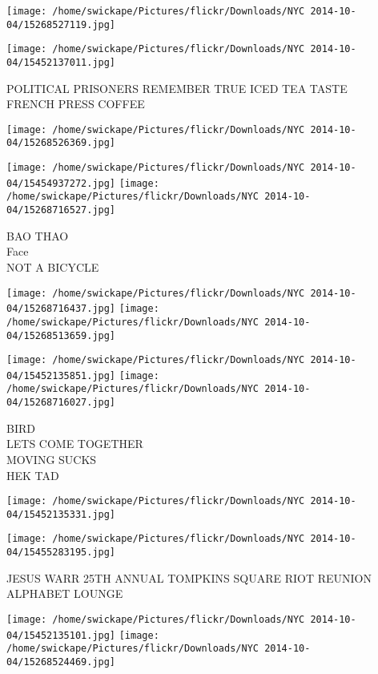 \documentclass[10pt,letterpaper]{article}
\begin{document}
\texttt{[image: /home/swickape/Pictures/flickr/Downloads/NYC 2014-10-04/15268527119.jpg]}

\vspace{0.25in}
\texttt{[image: /home/swickape/Pictures/flickr/Downloads/NYC 2014-10-04/15452137011.jpg]}

POLITICAL PRISONERS REMEMBER TRUE ICED TEA TASTE\\
FRENCH PRESS COFFEE\\
\pagebreak

\texttt{[image: /home/swickape/Pictures/flickr/Downloads/NYC 2014-10-04/15268526369.jpg]}

\vspace{0.25in}
\texttt{[image: /home/swickape/Pictures/flickr/Downloads/NYC 2014-10-04/15454937272.jpg]}
\texttt{[image: /home/swickape/Pictures/flickr/Downloads/NYC 2014-10-04/15268716527.jpg]}

BAO THAO\\
Face\\
NOT A BICYCLE\\
\pagebreak

\texttt{[image: /home/swickape/Pictures/flickr/Downloads/NYC 2014-10-04/15268716437.jpg]}
\texttt{[image: /home/swickape/Pictures/flickr/Downloads/NYC 2014-10-04/15268513659.jpg]}

\texttt{[image: /home/swickape/Pictures/flickr/Downloads/NYC 2014-10-04/15452135851.jpg]}
\texttt{[image: /home/swickape/Pictures/flickr/Downloads/NYC 2014-10-04/15268716027.jpg]}

BIRD\\
LETS COME TOGETHER\\
MOVING SUCKS\\
HEK TAD\\
\pagebreak

\texttt{[image: /home/swickape/Pictures/flickr/Downloads/NYC 2014-10-04/15452135331.jpg]}

\vspace{0.25in}
\texttt{[image: /home/swickape/Pictures/flickr/Downloads/NYC 2014-10-04/15455283195.jpg]}

JESUS WARR 25TH ANNUAL TOMPKINS SQUARE RIOT REUNION\\
ALPHABET LOUNGE\\
\pagebreak

\texttt{[image: /home/swickape/Pictures/flickr/Downloads/NYC 2014-10-04/15452135101.jpg]}
\texttt{[image: /home/swickape/Pictures/flickr/Downloads/NYC 2014-10-04/15268524469.jpg]}
\end{document}
